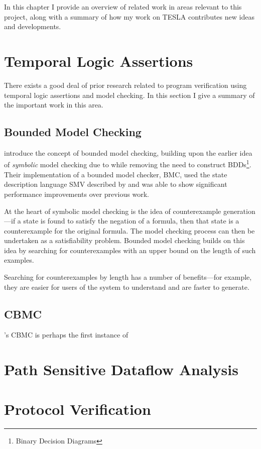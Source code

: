 In this chapter I provide an overview of related work in areas relevant
to this project, along with a summary of how my work on TESLA
contributes new ideas and developments.

\section{Temporal Logic Assertions} \label{sec:bounded-model-checking}

There exists a good deal of prior research related to program
verification using temporal logic assertions and model checking. In this
section I give a summary of the important work in this area.

\subsection{Bounded Model Checking}

\textcite{biere_symbolic_1999} introduce the concept of bounded model
checking, building upon the earlier idea of \emph{symbolic} model
checking due to \textcite{mcmillan_symbolic_1992} while removing the
need to construct BDDs\footnote{Binary Decision Diagrams}. Their
implementation of a bounded model checker, BMC, used the state
description language SMV described by
\citeauthor{mcmillan_symbolic_1992} and was able to show significant
performance improvements over previous work.

At the heart of symbolic model checking is the idea of counterexample
generation---if a state is found to satisfy the negation of a formula,
then that state is a counterexample for the original formula. The model
checking process can then be undertaken as a satisfiability problem.
Bounded model checking builds on this idea by searching for
counterexamples with an upper bound on the length of such examples.

Searching for counterexamples by length has a number of benefits---for
example, they are easier for users of the system to understand and are
faster to generate.

\subsection{CBMC}

\citeauthor{clarke_behavioral_2003}'s CBMC \cite{clarke_behavioral_2003}
is perhaps the first instance of 

\section{Path Sensitive Dataflow Analysis}

\section{Protocol Verification}
